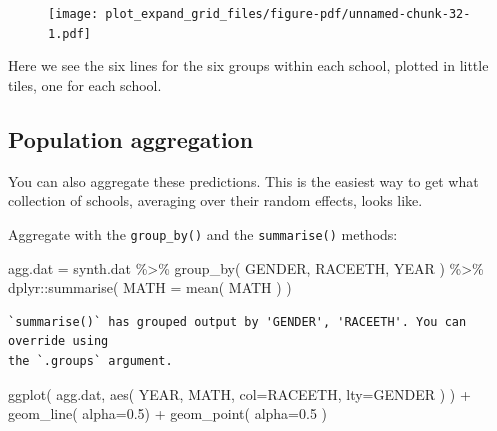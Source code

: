 \documentclass[
  letterpaper,
  DIV=11,
  numbers=noendperiod]{scrreprt}
\newenvironment{Shaded}{\begin{snugshade}}{\end{snugshade}}
\newcommand{\AttributeTok}[1]{\textcolor[rgb]{0.49,0.56,0.16}{#1}}
\newcommand{\FloatTok}[1]{\textcolor[rgb]{0.25,0.63,0.44}{#1}}
\newcommand{\FunctionTok}[1]{\textcolor[rgb]{0.02,0.16,0.49}{#1}}
\newcommand{\NormalTok}[1]{\textcolor[rgb]{0.00,0.44,0.13}{#1}}
\newcommand{\OtherTok}[1]{\textcolor[rgb]{0.00,0.44,0.13}{#1}}
\newcommand{\SpecialCharTok}[1]{\textcolor[rgb]{0.25,0.44,0.63}{#1}}
\begin{document}
\begin{figure}[H]

{\centering \texttt{[image: plot\_expand\_grid\_files/figure-pdf/unnamed-chunk-32-1.pdf]}

}

\end{figure}

Here we see the six lines for the six groups within each school, plotted
in little tiles, one for each school.

\hypertarget{population-aggregation}{%
\subsection{Population aggregation}\label{population-aggregation}}

You can also aggregate these predictions. This is the easiest way to get
what collection of schools, averaging over their random effects, looks
like.

Aggregate with the \texttt{group\_by()} and the \texttt{summarise()}
methods:

\begin{Shaded}
\begin{Highlighting}[]
\NormalTok{agg.dat }\OtherTok{=}\NormalTok{ synth.dat }\SpecialCharTok{\%\textgreater{}\%} \FunctionTok{group\_by}\NormalTok{( GENDER, RACEETH, YEAR ) }\SpecialCharTok{\%\textgreater{}\%}
\NormalTok{  dplyr}\SpecialCharTok{::}\FunctionTok{summarise}\NormalTok{( }\AttributeTok{MATH =} \FunctionTok{mean}\NormalTok{( MATH ) )}
\end{Highlighting}
\end{Shaded}

\begin{verbatim}
`summarise()` has grouped output by 'GENDER', 'RACEETH'. You can override using
the `.groups` argument.
\end{verbatim}

\begin{Shaded}
\begin{Highlighting}[]
\FunctionTok{ggplot}\NormalTok{( agg.dat, }\FunctionTok{aes}\NormalTok{( YEAR, MATH, }\AttributeTok{col=}\NormalTok{RACEETH, }\AttributeTok{lty=}\NormalTok{GENDER ) ) }\SpecialCharTok{+}
  \FunctionTok{geom\_line}\NormalTok{( }\AttributeTok{alpha=}\FloatTok{0.5}\NormalTok{) }\SpecialCharTok{+} \FunctionTok{geom\_point}\NormalTok{( }\AttributeTok{alpha=}\FloatTok{0.5}\NormalTok{ )}
\end{Highlighting}
\end{Shaded}
\end{document}
